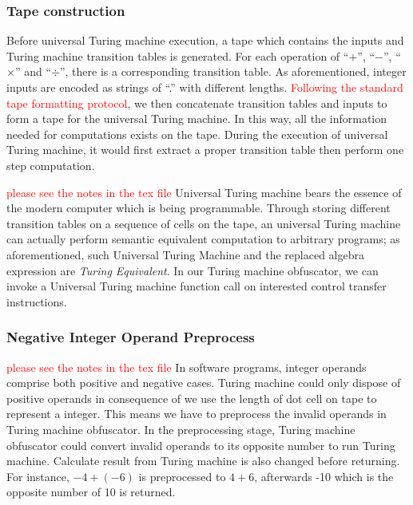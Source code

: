 \documentclass[lnicst]{svmultln}
\begin{document}
\subsubsection{Tape construction}
Before universal Turing machine execution, a tape which contains the inputs and
Turing machine transition tables is generated. For each operation of ``\(+\)'',
``\(-\)'', ``\(\times\)'' and ``\(\div\)'', there is a corresponding transition
table. As aforementioned, integer inputs are encoded as strings of ``.'' with
different lengths. \textcolor{red}{Following the standard tape formatting
  protocol},
we then concatenate transition tables and inputs to form a tape for the
universal Turing machine. In this way, all the information needed for
computations exists on the tape. During the execution of universal Turing
machine, it would first extract a proper transition table then perform one step
computation.

\textcolor{red}{please see the notes in the tex file}
Universal Turing machine bears the essence of the modern computer which is being
programmable. Through storing different transition tables on a sequence of cells
on the tape, an universal Turing machine can actually perform semantic
equivalent computation to arbitrary programs; as aforementioned, such Universal
Turing Machine and the replaced algebra expression are \textit{Turing
  Equivalent}. In our Turing machine obfuscator, we can invoke a Universal
Turing machine function call on interested control transfer instructions.

\subsubsection{Negative Integer Operand Preprocess}
\textcolor{red}{please see the notes in the tex file}
In software programs, integer operands comprise both positive and negative
cases. Turing machine could only dispose of positive operands in consequence of
we use the length of dot cell on tape to represent a integer. This means we have
to preprocess the invalid operands in Turing machine obfuscator. In the
preprocessing stage, Turing machine obfuscator could convert invalid operands to
its opposite number to run Turing machine. Calculate result from Turing machine
is also changed before returning. For instance, $-4 + (-6)$ is preprocessed to
$4 + 6$, afterwards -10 which is the opposite number of 10 is returned.
\end{document}
